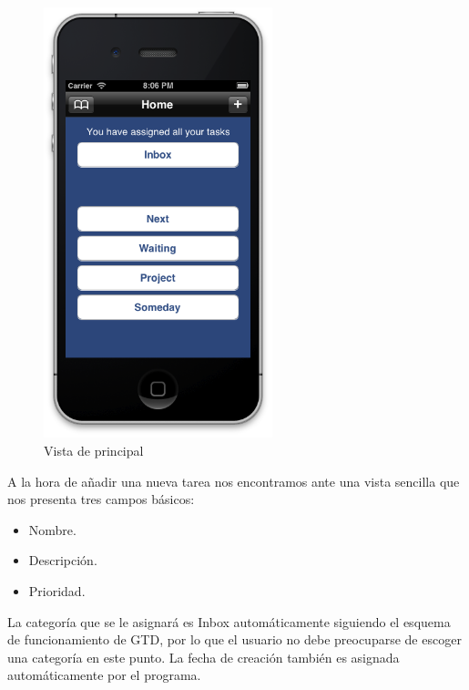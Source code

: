 \documentclass[parskip=half*]{scrartcl}
\begin{document}
\begin{figure}[h]
	\centering
	\includegraphics[height=12.5cm]{main.png}
	\caption{Vista de principal}
\end{figure}

A la hora de a\~nadir una nueva tarea nos encontramos ante una vista sencilla que nos presenta tres campos b\'asicos:

\begin{itemize}
	\item Nombre.
	\item Descripci\'on.
	\item Prioridad.
\end{itemize}

La categor\'ia que se le asignar\'a es Inbox autom\'aticamente siguiendo el esquema de funcionamiento de GTD, por lo que el usuario no debe preocuparse de escoger una categor\'ia en este punto. La fecha de creaci\'on tambi\'en es asignada autom\'aticamente por el programa.
\end{document}
